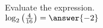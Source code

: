 \documentclass{ximera}
\author{David Kish}
\begin{document}
\begin{exercise}
Evaluate the expression.\\
$\log_2 \left(\frac{4}{16}\right)= \answer{-2}$
\end{exercise}
\end{document}
